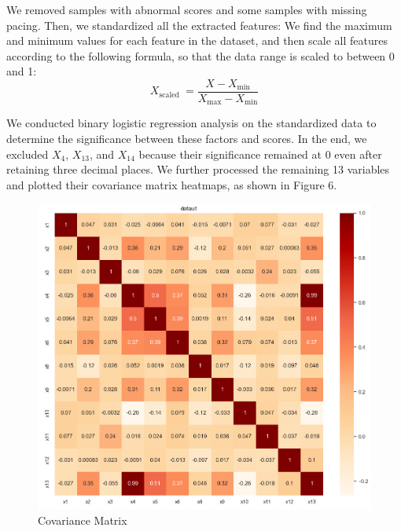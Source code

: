 \documentclass{mcmthesis}
\begin{document}
We removed samples with abnormal scores and some samples with missing pacing. Then, we standardized all the extracted features: We find the maximum and minimum values for each feature in the dataset, and then scale all features according to the following formula, so that the data range is scaled to between 0 and 1:
\[
	X_{\text {scaled }}=\frac{X-X_{\min }}{X_{\max }-X_{\min }}
\]

We conducted binary logistic regression analysis on the standardized data to determine the significance between these factors and scores. In the end, we excluded $X_4$, $X_{13}$, and $X_{14}$ because their significance remained at 0 even after retaining three decimal places. We further processed the remaining 13 variables and plotted their covariance matrix heatmaps, as shown in Figure 6.

\begin{figure}[h]
\centering
\includegraphics[width=12cm]{figures/covariance_matrix.png}
\caption{Covariance Matrix} \label{fig:aa}
\end{figure}
\end{document}
